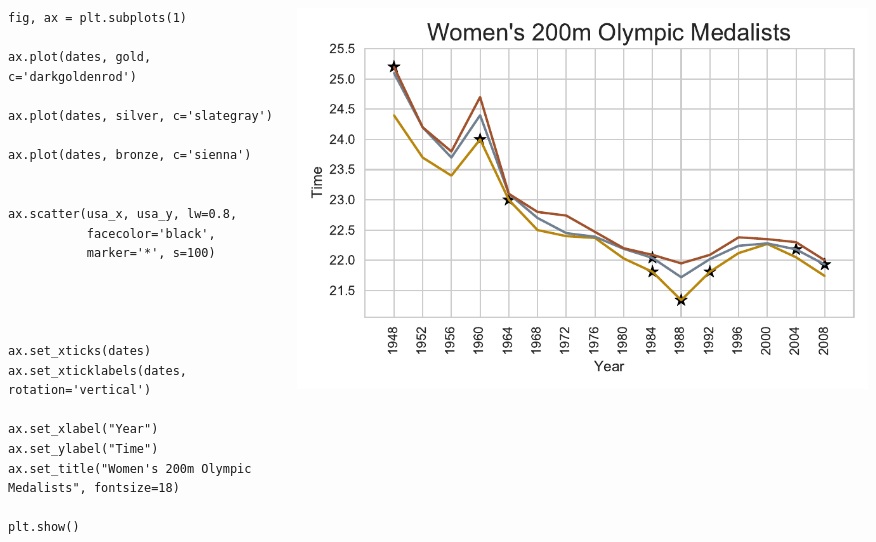 \documentclass{beamer}
\begin{document}
\begin{frame}[fragile]
\tiny{
\begin{columns}
\begin{column}{0.45\textwidth}
\begin{verbatim}
fig, ax = plt.subplots(1)

ax.plot(dates, gold, c='darkgoldenrod')

ax.plot(dates, silver, c='slategray')

ax.plot(dates, bronze, c='sienna')


ax.scatter(usa_x, usa_y, lw=0.8,
           facecolor='black',
           marker='*', s=100)




ax.set_xticks(dates)
ax.set_xticklabels(dates, rotation='vertical')

ax.set_xlabel("Year")
ax.set_ylabel("Time")
ax.set_title("Women's 200m Olympic Medalists", fontsize=18)

plt.show()
\end{verbatim}
\end{column}
\begin{column}{0.55\textwidth}
\includegraphics[width=\textwidth]{olympics_5.pdf}
\end{column}
\end{columns}
}
\end{frame}
\end{document}
